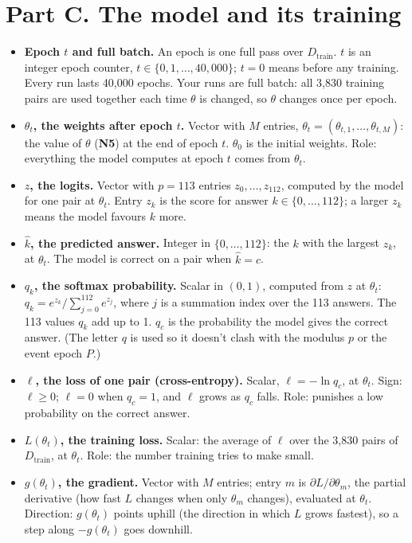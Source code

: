 \documentclass[11pt,a4paper,oneside,openany]{report}
\newcommand{\Dtrain}{D_{\mathrm{train}}}
\newcommand{\gl}[1]{\textbf{#1}}   %
\newenvironment{glist}{\begin{itemize}\setlength{\itemsep}{2pt}\setlength{\parskip}{1pt}}{\end{itemize}}
\begin{document}
\section*{Part C. The model and its training}

\begin{glist}
\item[\gl{N9}] \textbf{Epoch $t$ and full batch.} An epoch is one full pass over $\Dtrain$. $t$ is an integer epoch counter, $t \in \{0, 1, \ldots, 40{,}000\}$; $t = 0$ means before any training. Every run lasts 40{,}000 epochs. Your runs are full batch: all 3{,}830 training pairs are used together each time $\theta$ is changed, so $\theta$ changes once per epoch.
\item[\gl{N10}] \textbf{$\theta_t$, the weights after epoch $t$.} Vector with $M$ entries, $\theta_t = (\theta_{t,1}, \ldots, \theta_{t,M})$: the value of $\theta$ (\gl{N5}) at the end of epoch $t$. $\theta_0$ is the initial weights. Role: everything the model computes at epoch $t$ comes from $\theta_t$.
\item[\gl{N11}] \textbf{$z$, the logits.} Vector with $p = 113$ entries $z_0, \ldots, z_{112}$, computed by the model for one pair at $\theta_t$. Entry $z_k$ is the score for answer $k \in \{0, \ldots, 112\}$; a larger $z_k$ means the model favours $k$ more.
\item[\gl{N12}] \textbf{$\hat k$, the predicted answer.} Integer in $\{0, \ldots, 112\}$: the $k$ with the largest $z_k$, at $\theta_t$. The model is correct on a pair when $\hat k = c$.
\item[\gl{N13}] \textbf{$q_k$, the softmax probability.} Scalar in $(0, 1)$, computed from $z$ at $\theta_t$:
$q_k = e^{z_k} / \sum_{j=0}^{112} e^{z_j}$, where $j$ is a summation index over the 113 answers. The 113 values $q_k$ add up to 1. $q_c$ is the probability the model gives the correct answer. (The letter $q$ is used so it doesn't clash with the modulus $p$ or the event epoch $P$.)
\item[\gl{N14}] \textbf{$\ell$, the loss of one pair (cross-entropy).} Scalar, $\ell = -\ln q_c$, at $\theta_t$. Sign: $\ell \ge 0$; $\ell = 0$ when $q_c = 1$, and $\ell$ grows as $q_c$ falls. Role: punishes a low probability on the correct answer.
\item[\gl{N15}] \textbf{$L(\theta_t)$, the training loss.} Scalar: the average of $\ell$ over the 3{,}830 pairs of $\Dtrain$, at $\theta_t$. Role: the number training tries to make small.
\item[\gl{N16}] \textbf{$g(\theta_t)$, the gradient.} Vector with $M$ entries; entry $m$ is $\partial L / \partial \theta_m$, the partial derivative (how fast $L$ changes when only $\theta_m$ changes), evaluated at $\theta_t$. Direction: $g(\theta_t)$ points uphill (the direction in which $L$ grows fastest), so a step along $-g(\theta_t)$ goes downhill.

\end{glist}
\end{document}
